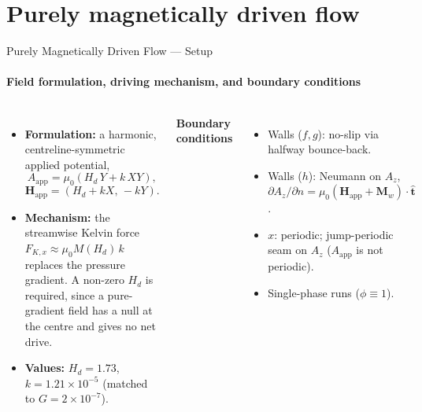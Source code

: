 \documentclass[aspectratio=43,10pt]{beamer}
\begin{document}
\section{Purely magnetically driven flow}

\begin{frame}{Purely Magnetically Driven Flow --- Setup}
  \framesubtitle{Field formulation, driving mechanism, and boundary conditions}
  \begin{columns}[T]
    \small
    \begin{itemize}
      \item \textbf{Formulation:} a harmonic, centreline-symmetric applied potential,
      \[ A_{\text{app}}=\mu_0(H_d\,Y+k\,XY), \]
      \[ \bm H_{\text{app}}=(H_d+kX,\,-kY). \]
      \item \textbf{Mechanism:} the streamwise Kelvin force $F_{K,x}\approx\mu_0 M(H_d)\,k$ replaces the pressure gradient. A non-zero $H_d$ is required, since a pure-gradient field has a null at the centre and gives no net drive.
      \item \textbf{Values:} $H_d=1.73$, $k=1.21\times10^{-5}$ (matched to $G=2\times10^{-7}$).
    \end{itemize}
    \centering

    \vspace{0.35cm}
    \raggedright\footnotesize
    \textbf{Boundary conditions}
    \begin{itemize}\footnotesize
      \item Walls ($f,g$): no-slip via halfway bounce-back.
      \item Walls ($h$): Neumann on $A_z$, $\partial A_z/\partial n=\mu_0(\bm H_{\text{app}}+\bm M_w)\cdot\hat{\bm t}$.
      \item $x$: periodic; jump-periodic seam on $A_z$ ($A_{\text{app}}$ is not periodic).
      \item Single-phase runs ($\phi\equiv 1$).
    \end{itemize}
  \end{columns}
\end{frame}
\end{document}
